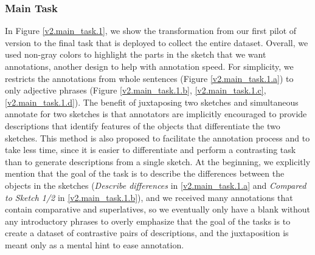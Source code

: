 \subsubsection{Main Task}
In Figure \ref{v2.main_task.1}, we show the transformation from our first pilot of version to the final task that is deployed to collect the entire dataset. 
Overall, we used non-gray colors to highlight the parts in the sketch that we want annotations, another design to help with annotation speed. 
For simplicity, we restricts the annotations from whole sentences (Figure \ref{v2.main_task.1.a}) to only adjective phrases (Figure \ref{v2.main_task.1.b}, \ref{v2.main_task.1.c}, \ref{v2.main_task.1.d}). The benefit of juxtaposing two sketches and simultaneous annotate for two sketches is that annotators are implicitly encouraged to provide descriptions that identify features of the objects that differentiate the two sketches. This method is also proposed to facilitate the annotation process and to take less time, since it is easier to differentiate and perform a contrasting task than to generate descriptions from a single sketch. 
At the beginning, we explicitly mention that the goal of the task is to describe the differences between the objects in the sketches (\textit{Describe differences} in \ref{v2.main_task.1.a} and \textit{Compared to Sketch 1/2} in \ref{v2.main_task.1.b}), and we received many annotations that contain comparative and superlatives, so we eventually only have a blank without any introductory phrases to overly emphasize that the goal of the tasks is to create a dataset of contrastive pairs of descriptions, and the juxtaposition is meant only as a mental hint to ease annotation.

